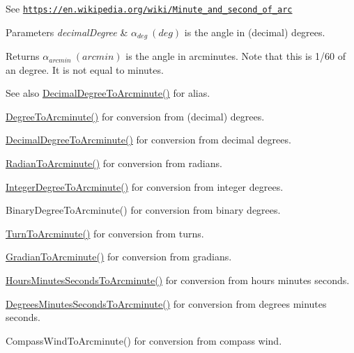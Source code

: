 See \href{https://en.wikipedia.org/wiki/Minute_and_second_of_arc}{\tt https\+://en.\+wikipedia.\+org/wiki/\+Minute\+\_\+and\+\_\+second\+\_\+of\+\_\+arc} 
\begin{DoxyParams}{Parameters}
{\em decimal\+Degree} & $\alpha_{deg}\ (deg)$ is the angle in (decimal) degrees. \\
\hline
\end{DoxyParams}
\begin{DoxyReturn}{Returns}
$\alpha_{arcmin}\ (arcmin)$ is the angle in arcminutes. Note that this is 1/60 of an degree. It is not equal to minutes. 
\end{DoxyReturn}
\begin{DoxySeeAlso}{See also}
\mbox{\hyperlink{group___e_g_x_math-_conversions-_angle_conversions-_decimal_degree_ga6b6ea6e45d2a13f556824ca419cc9fbd}{Decimal\+Degree\+To\+Arcminute()}} for alias. 

\mbox{\hyperlink{group___e_g_x_math-_conversions-_angle_conversions-_degree_ga8abf327dc5f52907b2c881999e9cc43e}{Degree\+To\+Arcminute()}} for conversion from (decimal) degrees. 

\mbox{\hyperlink{group___e_g_x_math-_conversions-_angle_conversions-_decimal_degree_ga6b6ea6e45d2a13f556824ca419cc9fbd}{Decimal\+Degree\+To\+Arcminute()}} for conversion from decimal degrees. 

\mbox{\hyperlink{group___e_g_x_math-_conversions-_angle_conversions-_radian_ga722e3b8e78540a6b3942b73b64aeb8d2}{Radian\+To\+Arcminute()}} for conversion from radians. 

\mbox{\hyperlink{group___e_g_x_math-_conversions-_angle_conversions-_integer_degree_ga78b014e7649d666a3647c467e64e4fe8}{Integer\+Degree\+To\+Arcminute()}} for conversion from integer degrees. 

Binary\+Degree\+To\+Arcminute() for conversion from binary degrees. 

\mbox{\hyperlink{group___e_g_x_math-_conversions-_angle_conversions-_turn_ga72cda928d9043c7d82097b1a7920769e}{Turn\+To\+Arcminute()}} for conversion from turns. 

\mbox{\hyperlink{group___e_g_x_math-_conversions-_angle_conversions-_gradian_ga67ef7daad49b0d73c39c52d426ab46a5}{Gradian\+To\+Arcminute()}} for conversion from gradians. 

\mbox{\hyperlink{group___e_g_x_math-_conversions-_angle_conversions-_hours_minutes_seconds_ga23bfa5abeb014726c2e2ac6303be5dae}{Hours\+Minutes\+Seconds\+To\+Arcminute()}} for conversion from hours minutes seconds. 

\mbox{\hyperlink{group___e_g_x_math-_conversions-_angle_conversions-_degrees_minutes_seconds_gadb8da2c4b9cdd4f618b6281314b1318c}{Degrees\+Minutes\+Seconds\+To\+Arcminute()}} for conversion from degrees minutes seconds. 

Compass\+Wind\+To\+Arcminute() for conversion from compass wind. 
\end{DoxySeeAlso}
\mbox{\label{group___e_g_x_math-_conversions-_angle_conversions-_degree_gaf85e2d765c248f447854a807a68a5de8}} 
